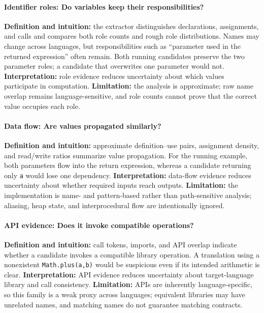 ﻿\documentclass[conference]{IEEEtran}
\begin{document}
\paragraph{Identifier roles: Do variables keep their responsibilities?}
\textbf{Definition and intuition:} the extractor distinguishes declarations, assignments, and calls and compares both role counts and rough role distributions. Names may change across languages, but responsibilities such as ``parameter used in the returned expression'' often remain. Both running candidates preserve the two parameter roles; a candidate that overwrites one parameter would not. \textbf{Interpretation:} role evidence reduces uncertainty about which values participate in computation. \textbf{Limitation:} the analysis is approximate; raw name overlap remains language-sensitive, and role counts cannot prove that the correct value occupies each role.

\paragraph{Data flow: Are values propagated similarly?}
\textbf{Definition and intuition:} approximate definition--use pairs, assignment density, and read/write ratios summarize value propagation. For the running example, both parameters flow into the return expression, whereas a candidate returning only \texttt{a} would lose one dependency. \textbf{Interpretation:} data-flow evidence reduces uncertainty about whether required inputs reach outputs. \textbf{Limitation:} the implementation is name- and pattern-based rather than path-sensitive analysis; aliasing, heap state, and interprocedural flow are intentionally ignored.

\paragraph{API evidence: Does it invoke compatible operations?}
\textbf{Definition and intuition:} call tokens, imports, and API overlap indicate whether a candidate invokes a compatible library operation. A translation using a nonexistent \texttt{Math.plus(a,b)} would be suspicious even if its intended arithmetic is clear. \textbf{Interpretation:} API evidence reduces uncertainty about target-language library and call consistency. \textbf{Limitation:} APIs are inherently language-specific, so this family is a weak proxy across languages; equivalent libraries may have unrelated names, and matching names do not guarantee matching contracts.
\end{document}
